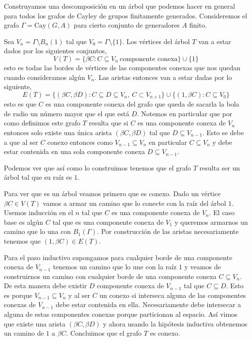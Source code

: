 \documentclass[tesis.tex]{subfiles}
\begin{document}
\begin{ej}\label{desc-grafo-cayley}%
	
	Construyamos una descomposición en un árbol que podemos hacer en general para todos los grafos de Cayley de grupos finitamente generados. 
	Consideremos el grafo $\Gamma = \text{Cay}(G,A)$ para cierto conjunto de generadores $A$ finito.
	
	
	Sea $V_n = \Gamma \setminus B_n(1) $ tal que $V_0 = \Gamma \setminus \{1\}$. 
	Los vértices del árbol $T$ van a estar dados por los siguientes conjuntos,
	\[
	V(T) = \{  \beta C : C \subseteq V_n \ \text{componente conexa}   \} \cup \{ 1 \}
	\]
	esto es todas las bordes de vértices de las componentes conexas que nos quedan cuando consideramos algún $V_n$. 
	Las aristas entonces van a estar dadas por lo siguiente,
	\[
	E(T) = \{ (\beta C , \beta D) : C \subseteq D \subseteq V_n, \ C \subset V_{n+1}   \} \cup \{  (1, \beta C) : C \subseteq V_0  \}
	\]
	esto es que $C$ es una componente conexa del grafo que queda de sacarla la bola de radio un número mayor que el que está $D$.
	Notemos en particular que por como definimos este grafo $T$ resulta que si $C$ es una componente conexa de $V_n$ entonces solo existe una única arista $(\beta C, \beta D)$ tal que $D \subseteq V_{n-1}$. 
	Esto se debe a que al ser $C$ conexo entonces como $V_{n-1} \subseteq V_{n}$ en particular $C \subseteq V_{n}$ y debe estar contenida en una sola componente conexa $D \subseteq V_{n-1}.$
	
	
	Podemos ver que así como lo construimos tenemos que el grafo $T$ resulta ser un árbol tal que su raíz es $1$. 
	
	Para ver que es un árbol veamos primero que es conexo. Dado un vértice $\beta C \in V(T)$ vamos a armar un camino que lo conecte con la raíz del árbol $1$. 
	Usemos inducción en el $n$ tal que $C$ es una componente conexa de $V_n$. 
	El caso base es algún $C$ tal que es una componente conexa de $V_1$ y queremos armarnos un camino que lo una con $B_1(\Gamma)$. 
	Por construcción de las aristas necesariamente tenemos que $(1, \beta C) \in E(T)$.
		
	Para el paso inductivo supongamos para cualquier borde de una componente conexa de $V_{n-1}$ tenemos un camino que lo une con la raíz $1$ y veamos de construirnos un camino con cualquier borde de una componente conexa $C \subseteq V_n$.
	De esta manera debe existir $D$ componente conexa de $V_{n-1}$ tal que $C \subseteq D$. Esto es porque $V_{n-1} \subseteq V_{n}$ y al ser $C$ un conexo si interseca alguna de las componentes conexas de $V_{n-1}$ debe estar contenida en ella. 
	Necesariamente debe intersecar a alguna de estas componentes conexas porque particionan al espacio.
	Así vimos que existe una arista $(\beta C, \beta D)$ y ahora usando la hipótesis inductiva obtenemos un camino de $1$ a $\beta C$.
	Concluimos que el grafo $T$ es conexo.   
	

\end{ej}
\end{document}
